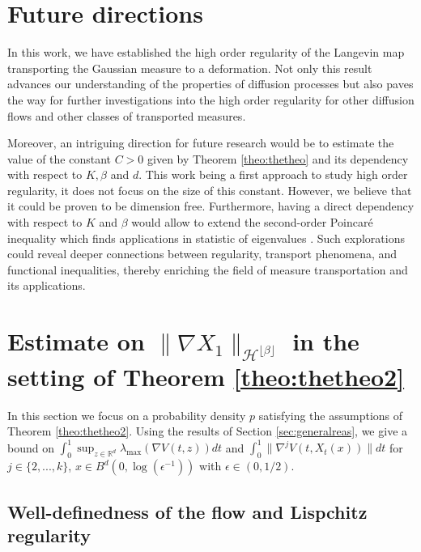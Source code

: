 \documentclass{article}
\begin{document}
\section*{Future directions}
In this work, we have established the high order regularity of the Langevin map transporting the Gaussian measure to a deformation. Not only this result advances our understanding of the properties of diffusion processes but also paves the way for further investigations into the high order regularity for other diffusion flows and other classes of transported measures.

Moreover, an intriguing direction for future research would be to estimate the value of the constant $C>0$ given by Theorem \ref{theo:thetheo}  and its dependency with respect to $K,\beta$ and $d$. This work being a first approach to study high order regularity, it does not focus on the size of this constant. However, we believe that it could be proven to be dimension free. Furthermore, having a direct  dependency with respect to $K$ and $\beta$ would allow to extend the second-order Poincaré inequality \cite{chatterjee2009fluctuations} which finds applications in statistic of eigenvalues \citep{bai2010spectral}. Such explorations could reveal deeper connections between regularity, transport phenomena, and functional inequalities, thereby enriching the field of measure transportation and its applications.





\newpage

\appendix


\section{Estimate on  $\|\nabla X_1\|_{\mathcal{H}^{\lfloor \beta \rfloor}}$ in the setting of Theorem \ref{theo:thetheo2}}\label{sec:prooftheo2}
In this section we focus on  a probability density $p$ satisfying the assumptions of Theorem \ref{theo:thetheo2}. Using the results of Section \ref{sec:generalreas}, we give a bound on $\int_0^1 \sup_{z\in \mathbb{R}^d}\lambda_{\max}(\nabla V(t,z))dt$ and $\int_0^1 \|\nabla^j V(t,X_t(x))\|dt$ for $j\in \{2,...,k\}$, $x\in B^d(0,\log(\epsilon^{-1}))$ with $\epsilon\in (0,1/2)$.


\subsection{Well-definedness of the flow and Lispchitz regularity}
\end{document}
